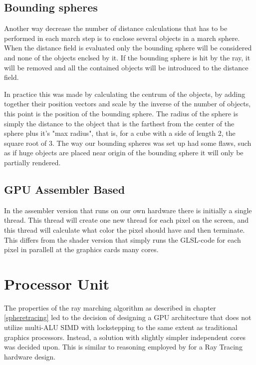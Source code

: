 		\subsection{Bounding spheres}
			
			Another way decrease the number of distance calculations that has
			to be performed in each march step is to enclose several objects in
			a march sphere. When the distance field is evaluated only the
			bounding sphere will be considered and none of the objects enclsed
			by it. If the bounding sphere is hit by the ray, it will be removed
			and all the contained objects will be introduced to the distance
			field. 

			In practice this was made by calculating the centrum of the
			objects, by adding together their position vectors and scale by the
			inverse of the number of objects, this point is the position of the
			bounding sphere. The radius of the sphere is simply the distance to
			the object that is the farthest from the center of the sphere plus
			it's "max radius", that is, for a cube with a side of length 2, the
			square root of 3. The way our bounding spheres was set up had some
			flaws, such as if huge objects are placed near origin of the
			bounding sphere it will only be partially rendered.


		\subsection{GPU Assembler Based}

			In the assembler version that runs on our own hardware there is
			initially a single thread. This thread will create one new thread
			for each pixel on the screen, and this thread will calculate what 
			color the pixel should have and then terminate. This differs from 
			the shader version that simply runs the GLSL-code for each pixel
			in parallell at the graphics cards many cores.

	\section{Processor Unit} \label{implproc}

		The properties of the ray marching algorithm as described in chapter
		\ref{spheretracing} led to the decision of designing a GPU architecture
		that does not utilize multi-ALU SIMD with lockstepping to the same
		extent as traditional graphics processors. Instead, a solution with
		slightly simpler independent cores was decided upon. This is similar to
		reasoning employed by \cite{Woop2005} for a Ray Tracing hardware
		design.

